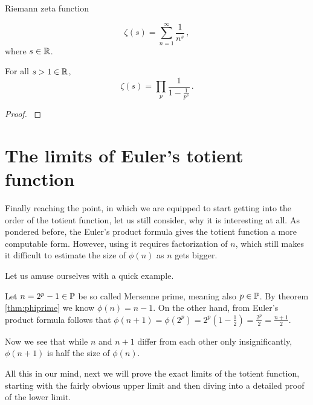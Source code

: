 \documentclass{article}
\begin{document}
\begin{definition}
Riemann zeta function \cite{HW:zeta}

\begin{equation*}
    \zeta(s)=\sum_{n=1}^\infty \frac{1}{n^s}\,,
\end{equation*}
where $s\in\mathbb{R}$.
\end{definition}

\begin{lemma}
\label{lemma:zeta}
For all $s>1\in\mathbb{R}$, 
\begin{equation*}
    \zeta(s)=\prod_p \frac{1}{1-\frac{1}{p^s}}\,.
\end{equation*}
\begin{proof}
\cite{HW:zeta}
\end{proof}
\end{lemma}

\section{The limits of Euler's totient function}

Finally reaching the point, in which we are equipped to start getting into the order of the totient function, let us still consider, why it is interesting at all. As pondered before, the Euler's product formula gives the totient function a more computable form. However, using it requires factorization of $n$, which still makes it difficult to estimate the size of $\phi(n)$ as $n$ gets bigger.

Let us amuse ourselves with a quick example.

\begin{example}
\cite{Pomerance} Let $n = 2^p - 1 \in \mathbb{P}$ be so called Mersenne prime, meaning also $p \in \mathbb{P}$. By theorem \ref{thm:phiprime} we know $\phi(n) = n - 1$. On the other hand, from Euler's product formula follows that $\phi(n+1) = \phi(2^p) = 2^p(1-\frac{1}{2}) = \frac{2^p}{2} = \frac{n+1}{2}$.

Now we see that while $n$ and $n+1$ differ from each other only insignificantly, $\phi(n+1)$ is half the size of $\phi(n)$.
\end{example}


All this in our mind, next we will prove the exact limits of the totient function, starting with the fairly obvious upper limit and then diving into a detailed proof of the lower limit.
\end{document}
